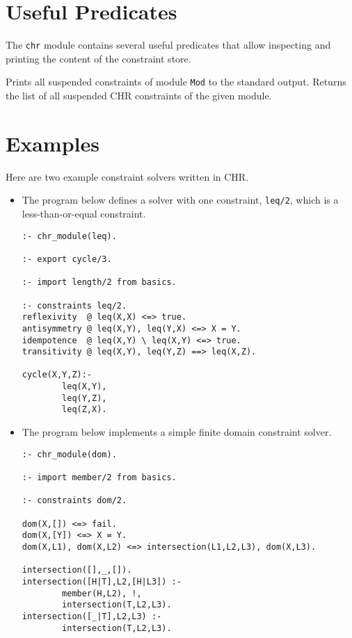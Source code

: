 \section{Useful Predicates} \label{predicates}

The \texttt{chr} module contains several useful predicates that allow
inspecting and printing the content of the constraint store.

\begin{description}
  Prints all suspended constraints of module \texttt{Mod} to
  the standard output.
  Returns the list of all suspended CHR constraints of the given module.
\end{description}

\section{Examples} \label{examples}

Here are two example constraint solvers written in CHR.

\begin{itemize}

\item
The program below defines a solver with one constraint, 
\texttt{leq/2}, which is a less-than-or-equal constraint.

\begin{verbatim}
:- chr_module(leq).

:- export cycle/3.

:- import length/2 from basics.

:- constraints leq/2.
reflexivity  @ leq(X,X) <=> true.
antisymmetry @ leq(X,Y), leq(Y,X) <=> X = Y.
idempotence  @ leq(X,Y) \ leq(X,Y) <=> true.
transitivity @ leq(X,Y), leq(Y,Z) ==> leq(X,Z).

cycle(X,Y,Z):-
        leq(X,Y),
        leq(Y,Z),
        leq(Z,X).
\end{verbatim}

\item
The program below implements a simple finite domain
constraint solver.

\begin{verbatim}
:- chr_module(dom).

:- import member/2 from basics.

:- constraints dom/2. 

dom(X,[]) <=> fail.
dom(X,[Y]) <=> X = Y.
dom(X,L1), dom(X,L2) <=> intersection(L1,L2,L3), dom(X,L3).

intersection([],_,[]).
intersection([H|T],L2,[H|L3]) :-
        member(H,L2), !,
        intersection(T,L2,L3).
intersection([_|T],L2,L3) :-
        intersection(T,L2,L3).
\end{verbatim}
		
\end{itemize}


